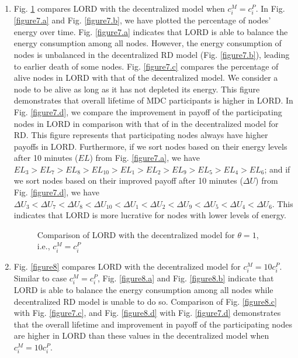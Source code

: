 \documentclass[journal,12pt, onecolumn]{IEEEtran}
\begin{document}
\begin{enumerate}
\item Fig. \ref{figure7} compares LORD with the decentralized model when $c_i ^{M} = c_i ^{P}$. In Fig. \ref{figure7.a} and Fig. \ref{figure7.b}, we have plotted the percentage of nodes' energy over time. Fig. \ref{figure7.a} indicates that LORD is able to balance the energy consumption among all nodes. However, the energy consumption of nodes is unbalanced in the decentralized RD model (Fig. \ref{figure7.b}), leading to earlier death of some nodes. Fig. \ref{figure7.c} compares the percentage of alive nodes in LORD with that of the decentralized model. We consider
a node to be alive as long as it has not depleted its energy.
This figure demonstrates that overall lifetime of MDC participants is higher in LORD. In Fig. \ref{figure7.d}, we compare the improvement in payoff of the participating nodes in LORD in comparison with that of in the decentralized model for RD. This figure represents that participating nodes always have higher payoffs in LORD. Furthermore, if we sort nodes based on their energy levels after 10 minutes ($EL$) from Fig. \ref{figure7.a}, we have $EL_3>EL_7>EL_8>EL_{10}>EL_1>EL_2>EL_9>EL_{5}>EL_4>EL_6$; and if we sort nodes based on their improved payoff after 10 minutes ($\Delta U$) from Fig. \ref{figure7.d}, we have $\Delta U_3<\Delta U_7<\Delta U_8<\Delta U_{10}<\Delta U_1<\Delta U_2<\Delta U_9<\Delta U_{5}<\Delta U_4<\Delta U_6$. This indicates that LORD is more lucrative for nodes with lower levels of energy.

\begin{figure}\centering
 \caption{Comparison of LORD with the decentralized model for $\theta = 1$, i.e., $c_i ^{M} = c_i ^{P}$}
\label{figure7}
\end{figure}

\item Fig. \ref{figure8} compares LORD with the decentralized model for $c_i ^{M} = 10c_i ^{P}$. Similar to case $c_i ^{M} = c_i ^{P}$, Fig. \ref{figure8.a} and Fig. \ref{figure8.b} indicate that LORD is able to balance the energy consumption among all nodes while decentralized RD model is unable to do so. Comparison of Fig. \ref{figure8.c} with Fig. \ref{figure7.c}, and Fig. \ref{figure8.d} with Fig. \ref{figure7.d} demonstrates that the overall lifetime and improvement in payoff of the participating nodes are higher in LORD than these values in the decentralized model when $c_i ^{M} = 10c_i ^{P}$. 



\end{enumerate}
\end{document}
